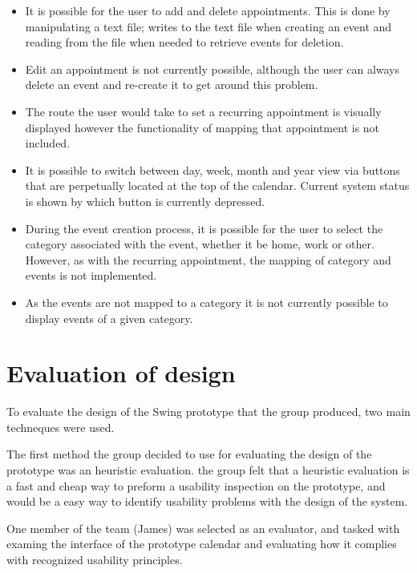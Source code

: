 \documentclass{article}
\begin{document}
\begin{itemize}
       
\item It is possible for the user to add and delete appointments. This is
done by manipulating a text file; writes to the text file when creating an
event and reading from the file when needed to retrieve events for deletion.
\item Edit an appointment is not currently possible, although the user can
always delete an event and re-create it to get around this problem.
\item The route the user would take to set a recurring appointment is
visually displayed however the functionality of mapping that appointment
is not included.
\item It is possible to switch between day, week, month and year view
via buttons that are perpetually located at the top of the calendar. Current
system status is shown by which button is currently depressed.
\item  During the event creation process, it is possible for the user to
select the category associated with the event, whether it be home, work or
other. However, as with the recurring appointment, the mapping of category
and events is not implemented.
\item As the events are not mapped to a category it is not currently
possible to display events of a given category.

\end{itemize}


\section{Evaluation of design}

To evaluate the design of the Swing prototype that the group produced, two main techneques were used.  

The first method the group decided to use for evaluating the design of the prototype was an heuristic evaluation. 
the group felt that a heuristic evaluation is a fast and cheap way to preform a usability inspection on the prototype, and would be a easy way to identify usability problems with the design of the system. 

One member of the team (James) was selected as an evaluator, and tasked with examing the interface of the prototype calendar and evaluating how it complies with recognized usability principles. 
\end{document}
